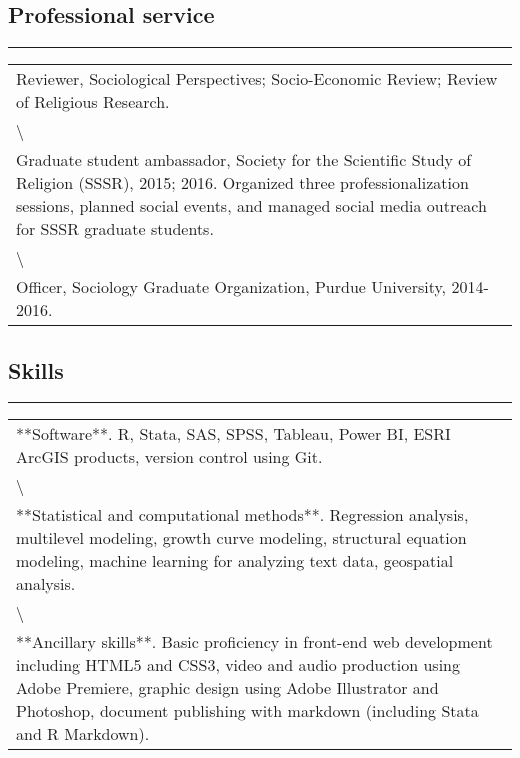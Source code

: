 \documentclass[
]{article}
\begin{document}
\hypertarget{professional-service}{%
\subsection{Professional service}\label{professional-service}}

\begin{center}\rule{0.5\linewidth}{\linethickness}\end{center}

\begin{tabular}{l}
\hline
\\
\hline
Reviewer, Sociological Perspectives; Socio-Economic Review; Review of Religious Research.\\
\hline
\textbackslash{}\\
\hline
Graduate student ambassador, Society for the Scientific Study of Religion (SSSR), 2015; 2016. Organized three professionalization sessions, planned social events, and managed social media outreach for SSSR graduate students.\\
\hline
\textbackslash{}\\
\hline
Officer, Sociology Graduate Organization, Purdue University, 2014-2016.\\
\hline
\end{tabular}

\hypertarget{skills}{%
\subsection{Skills}\label{skills}}

\begin{center}\rule{0.5\linewidth}{\linethickness}\end{center}

\begin{tabular}{l}
\hline
\\
\hline
**Software**. R, Stata, SAS, SPSS, Tableau, Power BI, ESRI ArcGIS products, version control using Git.\\
\hline
\textbackslash{}\\
\hline
**Statistical and computational methods**. Regression analysis, multilevel modeling, growth curve modeling, structural equation modeling, machine learning for analyzing text data, geospatial analysis.\\
\hline
\textbackslash{}\\
\hline
**Ancillary skills**. Basic proficiency in front-end web development including HTML5 and CSS3, video and audio production using Adobe Premiere, graphic design using Adobe Illustrator and Photoshop, document publishing with markdown (including Stata and R Markdown).\\
\hline
\end{tabular}
\end{document}
